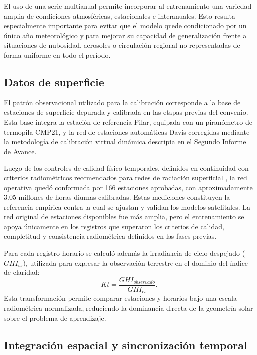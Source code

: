 \documentclass[../main.tex]{subfiles}
\begin{document}
El uso de una serie multianual permite incorporar al entrenamiento una variedad amplia de condiciones atmosféricas, estacionales e interanuales. Esto resulta especialmente importante para evitar que el modelo quede condicionado por un único año meteorológico y para mejorar su capacidad de generalización frente a situaciones de nubosidad, aerosoles o circulación regional no representadas de forma uniforme en todo el período.

\subsection{Datos de superficie}

El patrón observacional utilizado para la calibración corresponde a la base de estaciones de superficie depurada y calibrada en las etapas previas del convenio. Esta base integra la estación de referencia Pilar, equipada con un piranómetro de termopila CMP21, y la red de estaciones automáticas Davis corregidas mediante la metodología de calibración virtual dinámica descripta en el Segundo Informe de Avance.

Luego de los controles de calidad físico-temporales, definidos en continuidad con criterios radiométricos recomendados para redes de radiación superficial \cite{long2002}, la red operativa quedó conformada por 166 estaciones aprobadas, con aproximadamente 3.05 millones de horas diurnas calibradas. Estas mediciones constituyen la referencia empírica contra la cual se ajustan y validan los modelos satelitales. La red original de estaciones disponibles fue más amplia, pero el entrenamiento se apoya únicamente en los registros que superaron los criterios de calidad, completitud y consistencia radiométrica definidos en las fases previas.

Para cada registro horario se calculó además la irradiancia de cielo despejado ($GHI_{cs}$), utilizada para expresar la observación terrestre en el dominio del índice de claridad:
\begin{equation}
Kt = \frac{GHI_{observado}}{GHI_{cs}}.
\end{equation}
Esta transformación permite comparar estaciones y horarios bajo una escala radiométrica normalizada, reduciendo la dominancia directa de la geometría solar sobre el problema de aprendizaje.

\subsection{Integración espacial y sincronización temporal}
\end{document}

